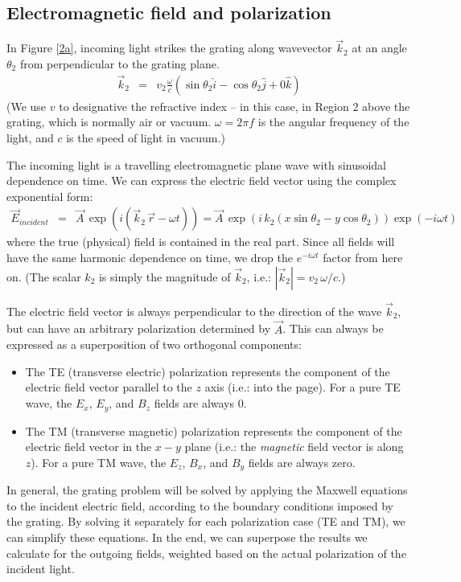 \subsection{Electromagnetic field and polarization}
In Figure \ref{2a}, incoming light strikes the grating along wavevector $\vec k_2$ at an angle $\theta_2$ from perpendicular to the grating plane.
\begin{eqnarray}
\vec k_2 &=& v_2 \frac{\omega}{c} \left( \sin \theta_2 \hat i - \cos \theta_2 \hat j + 0 \hat k \right)
\end{eqnarray}
(We use $v$ to designative the refractive index -- in this case, in Region 2 above the grating, which is normally air or vacuum.  $\omega = 2\pi f$ is the angular frequency of the light, and $c$ is the speed of light in vacuum.)

The incoming light is a travelling electromagnetic plane wave with sinusoidal dependence on time.  We can express the electric field vector using the complex exponential form:
\begin{eqnarray}
\vec E_{incident} &=& \vec A\, \exp \left(i (\vec k_2 \,  \vec r - \omega t)\right)  = \vec A\, \exp \left(i\, k_2 (x \sin \theta_2 - y \cos \theta_2)\right)\exp \left(- i \omega t\right)
\end{eqnarray}
where the true (physical) field is contained in the real part.  Since all fields will have the same harmonic dependence on time, we drop the $e^{-i\omega t}$ factor from here on.  (The scalar $k_2$ is simply the magnitude of $\vec k_2$, i.e.: $\left| \vec k_2 \right| = v_2\, \omega/c$.)

The electric field vector is always perpendicular to the direction of the wave $\vec k_2$, but can have an arbitrary polarization determined by $\vec A$.  This can always be expressed as a superposition of two orthogonal components:
\begin{itemize}
\item The TE (transverse electric) polarization represents the component of the electric field vector parallel to the $z$ axis (i.e.: into the page).  For a pure TE wave, the $E_x$, $E_y$, and $B_z$ fields are always 0.
\item The TM (transverse magnetic) polarization represents the component of the electric field vector in the $x-y$ plane (i.e.: the \emph{magnetic} field vector is along $z$).  For a pure TM wave, the $E_z$, $B_x$, and $B_y$ fields are always zero.
\end{itemize}
In general, the grating problem will be solved by applying the Maxwell equations to the incident electric field, according to the boundary conditions imposed by the grating.  By solving it separately for each polarization case (TE and TM), we can simplify these equations.  In the end, we can superpose the results we calculate for the outgoing fields, weighted based on the actual polarization of the incident light.

